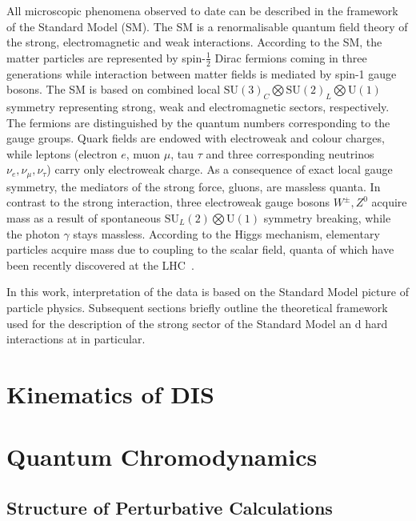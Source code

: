 All microscopic phenomena observed to date can be described in the framework of the Standard Model (SM). The SM is a renormalisable quantum field theory of the strong, electromagnetic and weak interactions. According to the SM, the matter particles are represented by spin-$\frac{1}{2}$ Dirac fermions coming in three generations while interaction between matter fields is mediated by spin-1 gauge bosons. The SM is based on combined local $\mathrm{SU}\left(3\right)_{C} \bigotimes \mathrm{SU}\left(2\right)_{L} \bigotimes \mathrm{U}\left(1\right)$ symmetry representing strong, weak and electromagnetic sectors, respectively. The fermions are distinguished by the quantum numbers corresponding to the gauge groups. Quark fields are endowed with electroweak and colour charges, while leptons (electron $e$, muon $\mu$, tau $\tau$ and three corresponding neutrinos $\nu_e, \nu_\mu, \nu_\tau$) carry only electroweak charge. As a consequence of exact local gauge symmetry, the mediators of the strong force, gluons, are massless quanta. In contrast to the strong interaction, three electroweak gauge bosons $W^\pm, Z^0$ acquire mass as a result of spontaneous $\mathrm{SU}_{L}\left(2\right) \bigotimes \mathrm{U}\left(1\right)$ symmetry breaking, while the photon $\gamma$ stays massless. According to the Higgs mechanism, elementary particles acquire mass due to coupling to the scalar field, quanta of which have been recently discovered at the LHC~\cite{pl:b716:1,pl:b716:30}.

In this work, interpretation of the data is based on the Standard Model picture of particle physics. Subsequent sections briefly outline the theoretical framework used for the description of the strong sector of the Standard Model an	d hard interactions at \hera in particular.

\section{Kinematics of DIS}
\label{sec:kindis}


\section{Quantum Chromodynamics}


\subsection{Structure of Perturbative Calculations}


